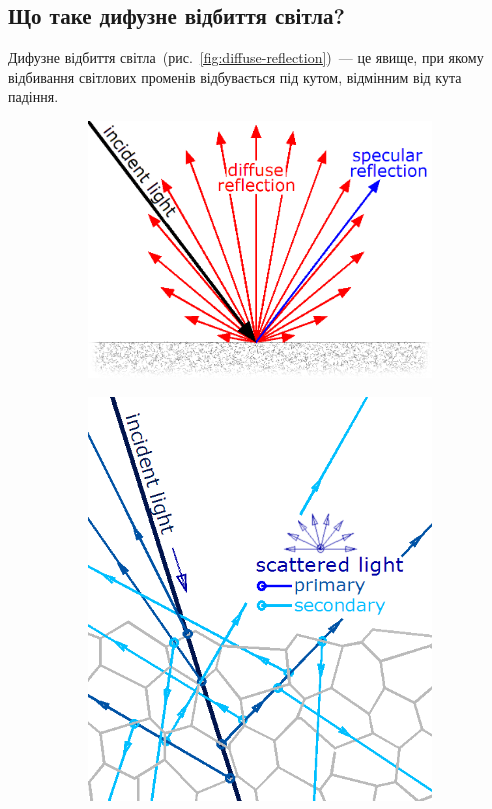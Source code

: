 \documentclass[
	a4paper,
	oneside,
	BCOR = 10mm,
	DIV = 12,
	12pt,
	headings = normal,
]{scrartcl}
\begin{document}
		\subsection{Що таке дифузне відбиття світла?}
			Дифузне відбиття світла~(рис.~\ref{fig:diffuse-reflection})~— це явище, при якому відбивання світлових променів відбувається під кутом, відмінним від кута падіння.

			\begin{figure}[!htbp]
				\centering
				\begin{subfigure}{0.5\textwidth}
					\centering
					\includegraphics[height = 8\baselineskip]{./assets/diffuse-reflection-lambert.png}
					\caption{}
					\label{subfig:diffuse-reflection-labertian}
				\end{subfigure}%
				\begin{subfigure}{0.5\textwidth}
					\centering
					\includegraphics[height = 8\baselineskip]{./assets/diffuse-reflection-subsurface.png}

\end{subfigure}
\end{figure}
\end{document}
